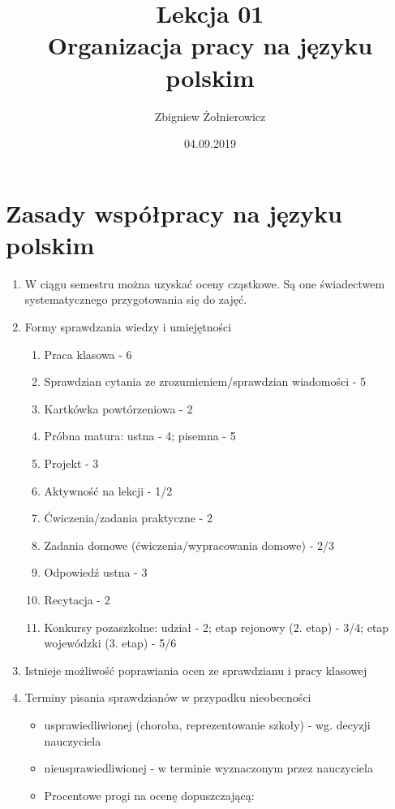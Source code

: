 \documentclass[a4paper]{article}
\begin{document}
\title{{\huge Lekcja 01} \\
{\large Organizacja pracy na języku polskim}}
\author{Zbigniew Żołnierowicz}
\date{04.09.2019}
\maketitle
\section{Zasady współpracy na języku polskim}
\begin{enumerate}
    \item W ciągu semestru można uzyskać oceny cząstkowe. Są one świadectwem systematycznego przygotowania się do zajęć.
    \item Formy sprawdzania wiedzy i umiejętności 
    \begin{enumerate}
        \item Praca klasowa - 6
        \item Sprawdzian cytania ze zrozumieniem/sprawdzian wiadomości - 5
        \item Kartkówka powtórzeniowa - 2
        \item Próbna matura: ustna - 4; pisemna - 5
        \item Projekt - 3
        \item Aktywność na lekcji - 1/2
        \item Ćwiczenia/zadania praktyczne - 2
        \item Zadania domowe (ćwiczenia/wypracowania domowe) - 2/3
        \item Odpowiedź ustna - 3
        \item Recytacja - 2
        \item Konkursy pozaszkolne: udział - 2; etap rejonowy (2. etap) - 3/4; etap wojewódzki (3. etap) - 5/6
    \end{enumerate}
    \item Istnieje możliwość poprawiania ocen ze sprawdzianu i pracy klasowej
    \item Terminy pisania sprawdzianów w przypadku nieobecności
    \begin{itemize}
        \item usprawiedliwionej (choroba, reprezentowanie szkoły) - wg. decyzji nauczyciela
        \item nieusprawiedliwionej - w terminie wyznaczonym przez nauczyciela
        \item Procentowe progi na ocenę dopuszczającą:
        \begin{itemize}

\end{itemize}
\end{itemize}
\end{enumerate}
\end{document}
